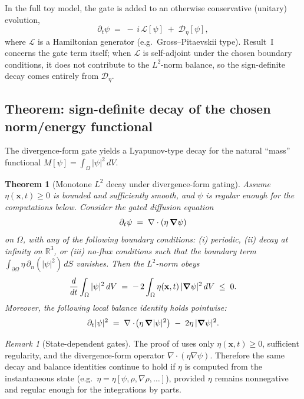 \documentclass[11pt]{article}
\theoremstyle{plain}
\newtheorem{theorem}{Theorem}
\theoremstyle{definition}
\theoremstyle{remark}
\newtheorem{remark}{Remark}
\newcommand{\R}{\mathbb{R}}
\newcommand{\diver}{\nabla\cdot}
\begin{document}
In the full toy model, the gate is added to an otherwise conservative (unitary) evolution,
\begin{equation}\label{eq:full_with_gate}
  \partial_t\psi \;=\; -\,i\,\mathcal{L}[\psi] \;+\; \mathcal{D}_{\eta}[\psi],
\end{equation}
where $\mathcal{L}$ is a Hamiltonian generator (e.g.\ Gross--Pitaevskii type). Result~I concerns the gate
term itself; when $\mathcal{L}$ is self-adjoint under the chosen boundary conditions, it does not
contribute to the $L^2$-norm balance, so the sign-definite decay comes entirely from
$\mathcal{D}_{\eta}$.

\subsection{Theorem: sign-definite decay of the chosen norm/energy functional}\label{sec:result_scalar_decay}
The divergence-form gate yields a Lyapunov-type decay for the natural ``mass'' functional
$M[\psi]=\int_{\Omega}|\psi|^2\,dV$.

\begin{theorem}[Monotone $L^2$ decay under divergence-form gating]\label{thm:L2_decay_div_form}
Assume $\eta(\mathbf{x},t)\ge 0$ is bounded and sufficiently smooth, and $\psi$ is regular enough for the
computations below. Consider the gated diffusion equation
\begin{equation}\label{eq:scalar_gate_pde}
  \partial_t\psi \;=\; \diver(\eta\,\grad\psi)
\end{equation}
on $\Omega$, with any of the following boundary conditions:
(i) periodic, (ii) decay at infinity on $\R^3$, or (iii) no-flux conditions such that the boundary term
$\int_{\partial\Omega}\eta\,\partial_n(|\psi|^2)\,dS$ vanishes. Then the $L^2$-norm obeys
\begin{equation}\label{eq:L2_decay_global}
  \frac{d}{dt}\int_{\Omega}|\psi|^2\,dV
  \;=\;
  -\,2\int_{\Omega}\eta(\mathbf{x},t)\,|\grad\psi|^2\,dV
  \;\le\; 0.
\end{equation}
Moreover, the following local balance identity holds pointwise:
\begin{equation}\label{eq:L2_decay_local}
  \partial_t|\psi|^2
  \;=\;
  \diver\!\big(\eta\,\grad|\psi|^2\big)
  \;-\;
  2\eta\,|\grad\psi|^2.
\end{equation}
\end{theorem}

\begin{remark}[State-dependent gates]\label{rem:state_dependent_eta_scalar}
The proof of  uses only $\eta(\mathbf{x},t)\ge 0$, sufficient regularity, and the divergence-form operator $\diver(\eta\nabla\psi)$. Therefore the same decay and balance identities continue to hold if $\eta$ is computed from the instantaneous state (e.g.\ $\eta=\eta[\psi,\rho,\nabla\rho,\ldots]$), provided $\eta$ remains nonnegative and regular enough for the integrations by parts.
\end{remark}
\end{document}
